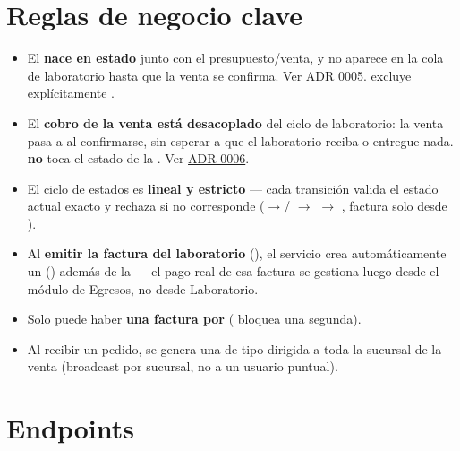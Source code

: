 \section{Reglas de negocio clave}
\label{sec:lab-reglas}

\begin{itemize}
  \item El  \textbf{nace en estado } junto con el presupuesto/venta, y no aparece en la cola de laboratorio hasta que la venta se confirma. Ver \hyperref[adr:0005]{ADR 0005}.  excluye explícitamente .
  \item El \textbf{cobro de la venta está desacoplado} del ciclo de laboratorio: la venta pasa a  al confirmarse, sin esperar a que el laboratorio reciba o entregue nada. \allowbreak {}\allowbreak {} \textbf{no} toca el estado de la . Ver \hyperref[adr:0006]{ADR 0006}.
  \item El ciclo de estados es \textbf{lineal y estricto} --- cada transición valida el estado actual exacto y rechaza si no corresponde (\allowbreak {}$\to$/\allowbreak {} $\to$  $\to$ , factura solo desde ).
  \item Al \textbf{emitir la factura del laboratorio} (\allowbreak {}\allowbreak {}), el servicio crea automáticamente un \allowbreak {}\allowbreak {} () además de la \allowbreak {} --- el pago real de esa factura se gestiona luego desde el módulo de Egresos, no desde Laboratorio.
  \item Solo puede haber \textbf{una factura por } ( bloquea una segunda).
  \item Al recibir un pedido, se genera una \allowbreak {} de tipo \allowbreak {}\allowbreak {} dirigida a toda la sucursal de la venta (broadcast por sucursal, no a un usuario puntual).
\end{itemize}

\section{Endpoints}
\label{sec:lab-endpoints}

